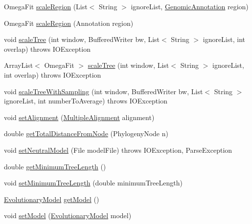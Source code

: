 \begin{DoxyCompactItemize}
\item 
Omega\+Fit \hyperlink{classbroad_1_1core_1_1siphy_1_1_tree_scaler_a690046ea37206c916a3f3834fda6f203}{scale\+Region} (List$<$ String $>$ ignore\+List, \hyperlink{interfacebroad_1_1core_1_1annotation_1_1_genomic_annotation}{Genomic\+Annotation} region)
\item 
Omega\+Fit \hyperlink{classbroad_1_1core_1_1siphy_1_1_tree_scaler_a4d39bd46f404c08bb844ae42fa6e8cdc}{scale\+Region} (Annotation region)
\item 
void \hyperlink{classbroad_1_1core_1_1siphy_1_1_tree_scaler_a6f7ecab5c4a2cddb25a3540d72ba5d27}{scale\+Tree} (int window, Buffered\+Writer bw, List$<$ String $>$ ignore\+List, int overlap)  throws I\+O\+Exception 
\item 
Array\+List$<$ Omega\+Fit $>$ \hyperlink{classbroad_1_1core_1_1siphy_1_1_tree_scaler_acf79dc568a6167e997a78d37ad3cc031}{scale\+Tree} (int window, List$<$ String $>$ ignore\+List, int overlap)  throws I\+O\+Exception 
\item 
void \hyperlink{classbroad_1_1core_1_1siphy_1_1_tree_scaler_a385c075371190ba318182301e4b907fb}{scale\+Tree\+With\+Sampling} (int window, Buffered\+Writer bw, List$<$ String $>$ ignore\+List, int number\+To\+Average)  throws I\+O\+Exception 
\item 
void \hyperlink{classbroad_1_1core_1_1siphy_1_1_tree_scaler_a7e93e3f043e6f1de3c113fc7910e10bb}{set\+Alignment} (\hyperlink{classbroad_1_1core_1_1multiplealignment_1_1_multiple_alignment}{Multiple\+Alignment} alignment)
\item 
double \hyperlink{classbroad_1_1core_1_1siphy_1_1_tree_scaler_add956377753d6a650493d0fae59994b0}{get\+Total\+Distance\+From\+Node} (Phylogeny\+Node n)
\item 
void \hyperlink{classbroad_1_1core_1_1siphy_1_1_tree_scaler_aac84894bf323063b0e023ae5aa23d0e8}{set\+Neutral\+Model} (File model\+File)  throws I\+O\+Exception, Parse\+Exception 
\item 
double \hyperlink{classbroad_1_1core_1_1siphy_1_1_tree_scaler_a95e23fcd6918e57aa1de02c5a821721c}{get\+Minimum\+Tree\+Length} ()
\item 
void \hyperlink{classbroad_1_1core_1_1siphy_1_1_tree_scaler_a39748e22702a23a62e6806516d4b9c4d}{set\+Minimum\+Tree\+Length} (double minimum\+Tree\+Length)
\item 
\hyperlink{classbroad_1_1core_1_1siphy_1_1_evolutionary_model}{Evolutionary\+Model} \hyperlink{classbroad_1_1core_1_1siphy_1_1_tree_scaler_a4f07812132f23c410d73c521776113df}{get\+Model} ()
\item 
void \hyperlink{classbroad_1_1core_1_1siphy_1_1_tree_scaler_a6874a8f4e920f45d2abe3461842138d9}{set\+Model} (\hyperlink{classbroad_1_1core_1_1siphy_1_1_evolutionary_model}{Evolutionary\+Model} model)
\end{DoxyCompactItemize}
